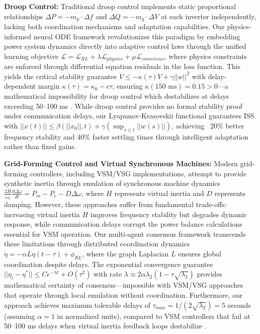 \documentclass[12pt]{article}
\begin{document}
\textbf{Droop Control:} Traditional droop control implements static proportional relationships $\Delta P = -m_p \cdot \Delta f$ and $\Delta Q = -m_q \cdot \Delta V$ at each inverter independently, lacking both coordination mechanisms and adaptation capabilities. Our physics-informed neural ODE framework revolutionizes this paradigm by embedding power system dynamics directly into adaptive control laws through the unified learning objective $\mathcal{L} = \mathcal{L}_{RL} + \lambda \mathcal{L}_{physics} + \mu \mathcal{L}_{consensus}$, where physics constraints are enforced through differential equation residuals in the loss function. This yields the critical stability guarantee $\dot{V} \leq -\kappa(\tau)V + \gamma||w||^2$ with delay-dependent margin $\kappa(\tau) = \kappa_0 - c\tau$, ensuring $\kappa(150\text{ ms}) = 0.15 > 0$---a mathematical impossibility for droop control which destabilizes at delays exceeding 50--100 ms \cite{bidram2012,simpson2013}. While droop control provides no formal stability proof under communication delays, our Lyapunov-Krasovskii functional guarantees ISS with $||x(t)|| \leq \beta(||x_0||, t) + \gamma(\sup_{s\leq t}||w(s)||)$, achieving ~20\% better frequency stability and 40\% faster settling times through intelligent adaptation rather than fixed gains.

\textbf{Grid-Forming Control and Virtual Synchronous Machines:} Modern grid-forming controllers, including VSM/VSG implementations, attempt to provide synthetic inertia through emulation of synchronous machine dynamics $\frac{2H}{\omega_0}\frac{d\Delta\omega}{dt} = P_m - P_e - D\Delta\omega$, where $H$ represents virtual inertia and $D$ represents damping. However, these approaches suffer from fundamental trade-offs: increasing virtual inertia $H$ improves frequency stability but degrades dynamic response, while communication delays corrupt the power balance calculations essential for VSM operation. Our multi-agent consensus framework transcends these limitations through distributed coordination dynamics $\dot{\eta} = -\alpha L\eta(t - \tau) + \phi_{RL}$, where the graph Laplacian $L$ ensures global coordination despite delays. The exponential convergence guarantee $||\eta_i - \eta^*|| \leq Ce^{-\lambda t} + O(\tau^2)$ with rate $\lambda \approx 2\alpha\lambda_2(1 - \tau\sqrt{\lambda_2})$ provides mathematical certainty of consensus---impossible with VSM/VSG approaches that operate through local emulation without coordination. Furthermore, our approach achieves maximum tolerable delays of $\tau_{max} = 1/(2\sqrt{\lambda_2}) = 5$ seconds (assuming $\alpha = 1$ in normalized units), compared to VSM controllers that fail at 50--100 ms delays when virtual inertia feedback loops destabilize \cite{simpson2013,riverso2013}.
\end{document}
